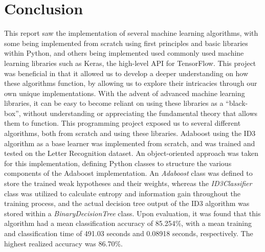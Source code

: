 \documentclass[a4paper]{article}
\begin{document}
\newpage
\section{Conclusion}\label{conclusion}

This report saw the implementation of several machine learning algorithms, with some being implemented from scratch using first principles and basic libraries within Python, and others being implemented used commonly used machine learning libraries such as Keras, the high-level API for TensorFlow. This project was beneficial in that it allowed us to develop a deeper understanding on how these algorithms function, by allowing us to explore their intricacies through our own unique implementations. With the advent of advanced machine learning libraries, it can be easy to become reliant on using these libraries as a ``black-box'', without understanding or appreciating the fundamental theory that allows them to function. This programming project exposed us to several different algorithms, both from scratch and using these libraries. Adaboost using the ID3 algorithm as a base learner was implemented from scratch, and was trained and tested on the Letter Recognition dataset. An object-oriented approach was taken for this implementation, defining Python classes to structure the various components of the Adaboost implementation. An \textit{Adaboost} class was defined to store the trained weak hypotheses and their weights, whereas the \textit{ID3Classifier} class was utilized to calculate entropy and information gain throughout the training process, and the actual decision tree output of the ID3 algorithm was stored within a \textit{BinaryDecisionTree} class. Upon evaluation, it was found that this algorithm had a mean classification accuracy of 85.254\%, with a mean training and classification time of 491.03 seconds and 0.08918 seconds, respectively. The highest realized accuracy was 86.70\%.
\end{document}
